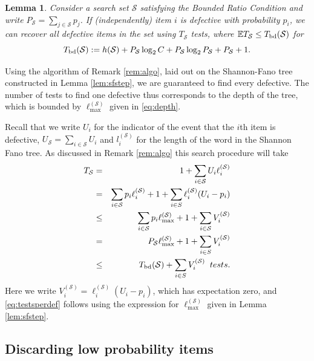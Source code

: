 \documentclass[conference]{IEEEtran}
\newtheorem{lemma}[theorem]{Lemma}
\newcommand{\ep}{{\mathbb{E}}}
\newcommand{\setS}{{\mathcal{S}}}
\newcommand{\bd}{{\rm bd}}
\begin{document}
\begin{lemma} \label{lem:expset}
 Consider a search set $\setS$ satisfying the Bounded Ratio Condition  and write $P_{\setS} = \sum_{j \in \setS} p_j$.
If (independently) item $i$ is defective with probability $p_i$, 
we can recover  all defective items in the set using $T_\setS$ tests, where $\ep T_\setS \leq T_{\bd}(\setS)$ for
\begin{equation} \label{eq:tbds}
 T_{\bd}(\setS) :=  h(\setS) +  P_{\setS} \log_2 C +  P_{\setS} \log_2 P_{\setS} + P_\setS + 1. \end{equation}
\end{lemma}
\begin{IEEEproof}
Using the algorithm of Remark \ref{rem:algo}, laid out on the Shannon-Fano tree constructed in Lemma \ref{lem:sfstep}, we are guaranteed  to find every defective.
The number of tests to find one defective thus corresponds to the depth of the tree, which is bounded by  $\ell_{\max}^{(\setS)}$ given in \eqref{eq:depth}.

Recall that we write $U_i$ for the indicator of the event that the $i$th item is defective, $U_{\setS} = \sum_{i \in \setS} U_i$ and 
$l_i^{(\setS)}$ for the length of the word in the Shannon Fano tree. As discussed in Remark \ref{rem:algo}
this search procedure will take 
\begin{eqnarray}
T_\setS & = &  1 + \sum_{i \in \setS} U_i \ell_i^{(\setS)} \nonumber \\
& = &  \sum_{i \in \setS} p_i \ell_i^{(\setS)} + 1 + \sum_{i \in S} \ell_i^{(\setS)} (U_i - p_i)  \nonumber \\
& \leq & \sum_{i \in \setS} p_i \ell_{\max}^{(\setS)} +  1 + \sum_{i \in \setS} V_i^{(\setS)}  \nonumber \\
& =  &  P_{\setS} \ell_{\max}^{(\setS)} +  1 + \sum_{i \in S} V_i^{(\setS)} \nonumber \\
& \leq  & T_{\bd}(\setS) + \sum_{i \in S} V_i^{(\setS)} 
\mbox{ \;\; tests.} \label{eq:testsperdef} \end{eqnarray}
Here we write $V_ i^{(\setS)} = \ell_i^{(\setS)} (U_i - p_i)$, which has expectation zero, and \eqref{eq:testsperdef} follows using the expression for 
$\ell_{\max}^{(\setS)}$ given in   Lemma \ref{lem:sfstep}.
\end{IEEEproof}

\subsection{Discarding low probability items} \label{sec:discard}
\end{document}
